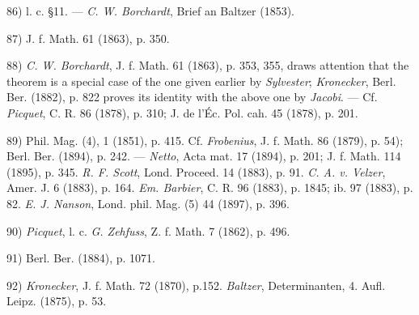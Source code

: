 \vfill
\leftline{\rule{2in}{0.4pt}}
\vspace{0.2cm}
{
\footnotesize
86) l. c. §11. — \textit{C. W. Borchardt}, Brief an Baltzer (1853).

87) J. f. Math. 61 (1863), p. 350.

88) \textit{C. W. Borchardt}, J. f. Math. 61 (1863), p. 353, 355, draws attention that the theorem is a special case of the one given earlier by \textit{Sylvester}; \textit{Kronecker}, Berl. Ber. (1882), p. 822 proves its identity with the above one by \textit{Jacobi}. — Cf. \textit{Picquet}, C. R. 86 (1878), p. 310; J. de l'Éc. Pol. cah. 45 (1878), p. 201.

89) Phil. Mag. (4), 1 (1851), p. 415. Cf. \textit{Frobenius}, J. f. Math. 86 (1879), p. 54); Berl. Ber. (1894), p. 242. — \textit{Netto}, Acta mat. 17 (1894), p. 201; J. f. Math. 114 (1895), p. 345. \textit{R. F. Scott}, Lond. Proceed. 14 (1883), p. 91. \textit{C. A. v. Velzer}, Amer. J. 6 (1883), p. 164. \textit{Em. Barbier}, C. R. 96 (1883), p. 1845; ib. 97 (1883), p. 82. \textit{E. J. Nanson}, Lond. phil. Mag. (5) 44 (1897), p. 396.

90) \textit{Picquet}, l. c. \textit{G. Zehfuss}, Z. f. Math. 7 (1862), p. 496.

91) Berl. Ber. (1884), p. 1071.

92) \textit{Kronecker}, J. f. Math. 72 (1870), p.152. \textit{Baltzer}, Determinanten, 4. Aufl. Leipz. (1875), p. 53.

}
